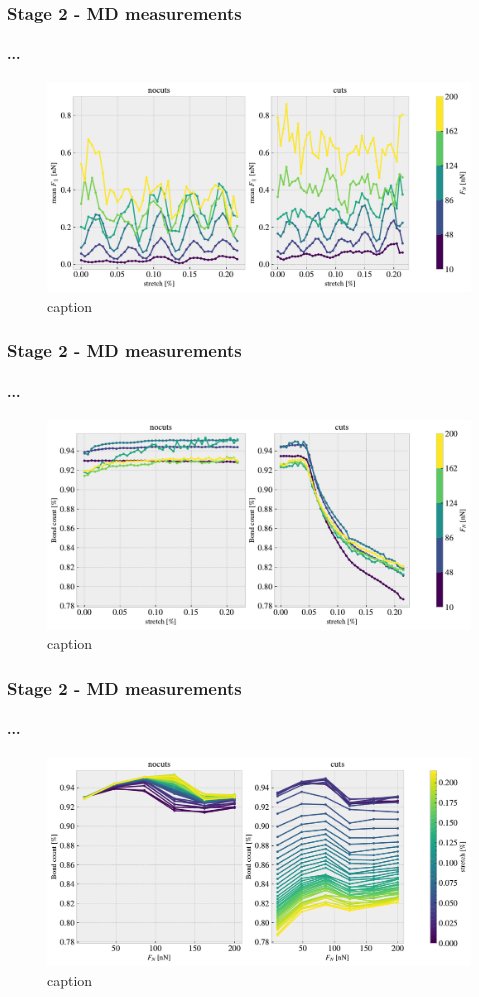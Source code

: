 \documentclass[
	10pt, %
]{beamer}
\begin{document}
\begin{frame}
	\frametitle{Stage 2 - MD measurements}
	\framesubtitle{...}
	\begin{figure}
		\includegraphics[width=\linewidth]{figures/multi2.pdf}
		\caption{caption}
	\end{figure}	
\end{frame}

\begin{frame}
	\frametitle{Stage 2 - MD measurements}
	\framesubtitle{...}
	\begin{figure}
		\includegraphics[width=\linewidth]{figures/multi3.pdf}
		\caption{caption}
	\end{figure}	
\end{frame}

\begin{frame}
	\frametitle{Stage 2 - MD measurements}
	\framesubtitle{...}
	\begin{figure}
		\includegraphics[width=\linewidth]{figures/multi4.pdf}
		\caption{caption}
	\end{figure}	
\end{frame}
\end{document}
